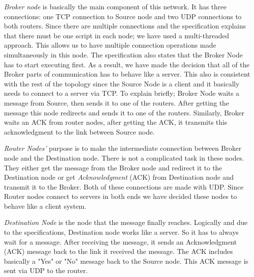 \documentclass[conference]{IEEEtran}
\begin{document}
\par \textit{Broker node} is basically the main component of this network. It has three connections: one TCP connection to Source node and two UDP connections to both routers. Since there are multiple connections and the specification explains that there must be one script in each node; we have used a multi-threaded approach. This allows us to have multiple connection  operations made simultaneously in this node. The specification also states that the Broker Node has to start executing first. As a result, we have made the decision that all of the Broker parts of communication has to behave like a server. This also is consistent with the rest of the topology since the Source Node is a client and it basically needs to connect to a server via TCP. To explain briefly; Broker Node waits a message from Source, then sends it to one of the routers. After getting the message this node redirects and sends it to one of the routers. Similarly, Broker waits an ACK from router nodes, after getting the ACK, it transmits this acknowledgment to the link between Source node. 

\par \textit{Router Nodes'} purpose is to make the intermediate connection between Broker node and the Destination node. There is not a complicated task in these nodes. They either get the message from the Broker node and redirect it to the Destination node or get \textit{Acknowledgment} (ACK) from Destination node and transmit it to the Broker. Both of these connections are made with UDP. Since Router nodes connect to servers in both ends we have decided these nodes to behave like a client system.

\par \textit{Destination Node} is the node that the message finally reaches. Logically and due to the specifications, Destination node works like a server. So it has to always wait for a message. After receiving the message, it sends an Acknowledgment (ACK) message back to the link it received the message. The ACK includes basically a "Yes" or "No" message back to the Source node. This ACK message is sent via UDP to the router.
\end{document}

